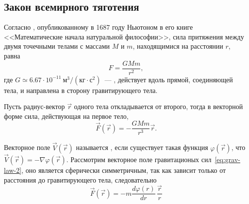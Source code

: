 \subsection{Закон всемирного тяготения}
Согласно , опубликованному в 1687 году Ньютоном в его книге <<Математические начала натуральной философии>>, сила притяжения между двумя точечными телами с массами $M$ и $m$, находящимися на расстоянии $r$, равна
\begin{equation}
	F=\frac{GMm}{r^2}, 
	\label{eq:grav-law-1}
\end{equation}\nopagebreak где $G\simeq 6.67\cdot 10^{-11}~\text{м}^3 /\left( \text{кг} \cdot \text{с}^2 \right)$~---  , действует вдоль прямой, соединяющей тела, и направлена в сторону гравитирующего тела.

Пусть радиус-вектор $\vec r$ одного тела откладывается от второго, тогда в векторной форме сила, действующая на первое тело,
\begin{equation}
	\vec F (\vec r) = -\frac{GMm}{r^3} \vec r. 
	\label{eq:grav-law-2}
\end{equation}

Векторное поле $\vec V (\vec r)$ называется , если существует такая функция $\varphi(\vec r)$, что $\vec V (\vec r) = - \nabla \varphi(\vec r)$. Рассмотрим векторное поле гравитационых сил~\eqref{eq:grav-law-2}, оно является сферически симметричным, так как зависит только от расстояния до гравитирующего тела, следовательно
\begin{equation*}
	\vec F (\vec r) = -m \frac{d\varphi(r)}{dr} \, \frac{\vec{r}}{r}
\end{equation*} 

